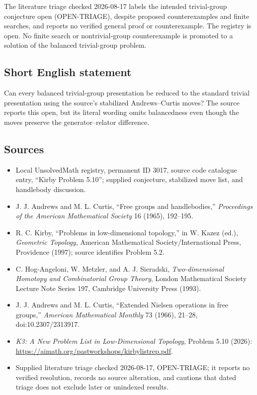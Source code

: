 \documentclass[11pt]{article}
\begin{document}
The literature triage checked 2026-08-17 labels the intended trivial-group conjecture open (OPEN-TRIAGE), despite proposed counterexamples and finite searches, and reports no verified general proof or counterexample. The registry is open. No finite search or nontrivial-group counterexample is promoted to a solution of the balanced trivial-group problem.
\subsection{Short English statement}
Can every balanced trivial-group presentation be reduced to the standard trivial presentation using the source's stabilized Andrews--Curtis moves? The source reports this open, but its literal wording omits balancedness even though the moves preserve the generator--relator difference.
\subsection{Sources}
\begin{itemize}
\item Local UnsolvedMath registry, permanent ID 3017, source code catalogue entry, ``Kirby Problem 5.10''; supplied conjecture, stabilized move list, and handlebody discussion.
\item [AC65] J. J. Andrews and M. L. Curtis, ``Free groups and handlebodies,'' \emph{Proceedings of the American Mathematical Society} 16 (1965), 192--195.
\item [Kir97] R. C. Kirby, ``Problems in low-dimensional topology,'' in W. Kazez (ed.), \emph{Geometric Topology}, American Mathematical Society/International Press, Providence (1997); source identifies Problem 5.2.
\item [HAMS93] C. Hog-Angeloni, W. Metzler, and A. J. Sieradski, \emph{Two-dimensional Homotopy and Combinatorial Group Theory}, London Mathematical Society Lecture Note Series 197, Cambridge University Press (1993).
\item [AC66] J. J. Andrews and M. L. Curtis, ``Extended Nielsen operations in free groups,'' \emph{American Mathematical Monthly} 73 (1966), 21--28, doi:10.2307/2313917.
\item \emph{K3: A New Problem List in Low-Dimensional Topology}, Problem 5.10 (2026): \url{https://aimath.org/pastworkshops/kirbylistrep.pdf}.
\item Supplied literature triage checked 2026-08-17, OPEN-TRIAGE; it reports no verified resolution, records no source alteration, and cautions that dated triage does not exclude later or unindexed results.
\end{itemize}
\end{document}
